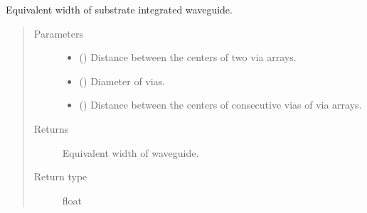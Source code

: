 \documentclass[letterpaper,10pt,english]{sphinxmanual}
\begin{document}

\begin{fulllineitems}
\label{\detokenize{components:components.SIW_EquivalentWidth}}
Equivalent width of substrate integrated waveguide.
\begin{quote}\begin{description}
\item[{Parameters}] \leavevmode\begin{itemize}
\item {} 
 () \textendash{} Distance between the centers of two via arrays.

\item {} 
 () \textendash{} Diameter of vias.

\item {} 
 () \textendash{} Distance between the centers of consecutive vias of via arrays.

\end{itemize}

\item[{Returns}] \leavevmode
Equivalent width of waveguide.

\item[{Return type}] \leavevmode
float

\end{description}\end{quote}

\end{fulllineitems}

\end{document}
